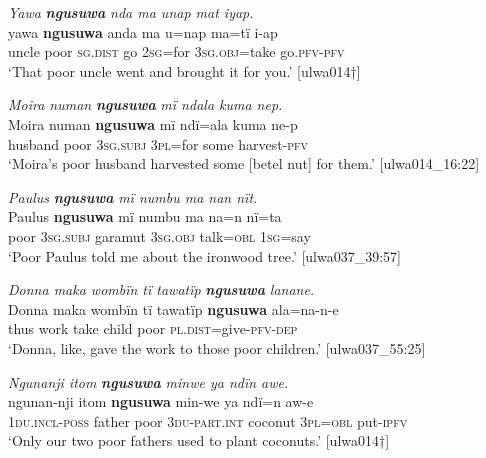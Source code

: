 \ea%
    \label{ex:pron:95}
          \textit{Yawa} \textbf{\textit{ngusuwa}} \textit{nda ma unap mat iyap.}\\
\gll    yawa  \textbf{ngusuwa}  anda    ma   u=nap    ma=tï i-ap\\
    uncle  poor    \textsc{sg.dist}  go  2\textsc{sg}=for  3\textsc{sg.obj}=take    go.\textsc{pfv-pfv}\\
\glt `That poor uncle went and brought it for you.’ [ulwa014†]
\z

\ea%
    \label{ex:pron:96}
          \textit{Moira numan} \textbf{\textit{ngusuwa}} \textit{mï ndala kuma nep.}\\
\gll    Moira  numan    \textbf{ngusuwa}  mï      ndï=ala  kuma ne-p\\
    [name]  husband  poor    3\textsc{sg.subj}  3\textsc{pl=}for  some    harvest-\textsc{pfv}\\
\glt `Moira’s poor husband harvested some [betel nut] for them.’ [ulwa014\_16:22]
\z

\newpage

\ea%
    \label{ex:pron:97}
          \textit{Paulus} \textbf{\textit{ngusuwa}} \textit{mï numbu ma nan nït.}\\
\gll Paulus  \textbf{ngusuwa}  mï      numbu    ma      na=n nï=ta\\
    [name]  poor    3\textsc{sg.subj}  garamut  \textsc{3sg.obj}  talk\textsc{=obl}    \textsc{1sg=}say\\
\glt `Poor Paulus told me about the ironwood tree.’ [ulwa037\_39:57]
\z

\ea%
    \label{ex:pron:98}
          \textit{Donna maka wombïn tï tawatïp} \textbf{\textit{ngusuwa}} \textit{lanane.}\\
\gll Donna  maka  wombïn  tï    tawatïp    \textbf{ngusuwa} ala=na-n-e\\
    [name]  thus  work    take   child    poor    \textsc{pl.dist}=give-\textsc{pfv-dep}\\
\glt `Donna, like, gave the work to those poor children.’ [ulwa037\_55:25]
\z

\ea%
    \label{ex:pron:99}
          \textit{Ngunanji itom} \textbf{\textit{ngusuwa}} \textit{minwe ya ndïn awe.}\\
\gll ngunan-nji      itom  \textbf{ngusuwa}  min-we      ya ndï=n    aw-e\\
    1\textsc{du.incl-poss}  father  poor    3\textsc{du-part.int}   coconut    3\textsc{pl=obl}  put\textsc{{}-ipfv}\\
\glt `Only our two poor fathers used to plant coconuts.’ [ulwa014†]
\z


